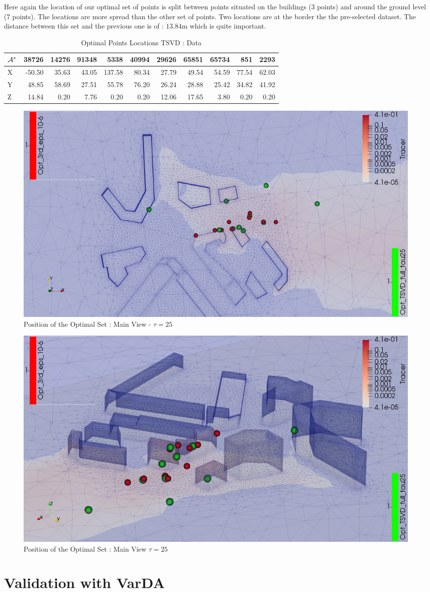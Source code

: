 Here again the location of our optimal set of points is split between points situated on the buildings (3 points) and around the ground level (7 points). The locations are more spread than the other set of points. Two locations are at the border the the pre-selected dataset. The distance between this set and the previous one is of : $13.84$m which is quite important.  \\ 



\begin{table}[h]
\centering
\footnotesize
\begin{tabular}{|l|rrrrrrrrrr|}
\hline
$\mathcal{A}^*$ &  38726 &  14276 &  91348 &  5338  &  40994 &  29626 &  65851 &  65734 &  851   &  2293  \\
\hline
X & -50.50 &  35.63 &  43.05 & 137.58 &  80.34 &  27.79 &  49.54 &  54.59 &  77.54 &  62.03 \\
Y &  48.85 &  58.69 &  27.51 &  55.78 &  76.20 &  26.24 &  28.88 &  25.42 &  34.82 &  41.92 \\
Z &  14.84 &   0.20 &   7.76 &   0.20 &   0.20 &  12.06 &  17.65 &   3.80 &   0.20 &   0.20 \\
\hline
\end{tabular}
\caption{Optimal Points Locations TSVD : Data}
\label{tab:tsvd:data}
\end{table}


\begin{figure}[h!]
\centering
\includegraphics[width=0.7\linewidth]{figures/MainOptimTSVD/tsvd+3rd_position_top}
\caption{Position of the Optimal Set : Main View - $\tau = 25$}
\label{fig:full_set_tsvd:position:top}
\end{figure}

\begin{figure}[h!]
\centering
\includegraphics[width=0.7\linewidth]{figures/MainOptimTSVD/tsvd+3rd_position_side}
\caption{Position of the Optimal Set : Main View $\tau = 25$}
\label{fig:full_set_tsvd:position:zoom}
\end{figure}








\section{Validation with VarDA}

